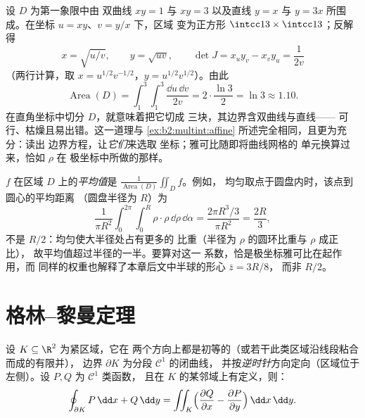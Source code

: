 \begin{example}[适应曲线型区域的
坐标]\label{ex:b2:multint:hyperbolicregion}
设 $D$ 为第一象限中由
双曲线 $xy = 1$ 与 $xy = 3$ 以及直线 $y = x$ 与
$y = 3x$ 所围成。在坐标 $u = xy$、$v = y/x$ 下，区域
变为正方形 $\intcc13 \times \intcc13$；反解得
\[
x = \sqrt{u/v}, \qquad y = \sqrt{uv},
\qquad
\det J = x_uy_v - x_vy_u = \frac{1}{2v}
\]
（两行计算，取 $x = u^{1/2}v^{-1/2}$，$y =
u^{1/2}v^{1/2}$）。由此
\[
\operatorname{Area}(D)
= \int_1^3\!\!\int_1^3\frac{\dd u\,\dd v}{2v}
= 2\cdot\frac{\ln 3}{2} = \ln 3 \approx 1.10 .
\]
在直角坐标中切分 $D$，就意味着把它切成
三块，其边界含双曲线与直线——
可行、枯燥且易出错。这一道理与
\cref{ex:b2:multint:affine} 所述完全相同，且更为充分：读出
边界方程，让\emph{它们}来选取
坐标；雅可比随即将曲线网格的
单元换算过来，恰如 $\rho$ 在
极坐标中所做的那样。
\end{example}

\begin{example}[平均值]\label{ex:b2:multint:average}
$f$ 在区域 $D$ 上的\emph{平均值}是
$\frac1{\operatorname{Area}(D)}\iint_Df$。例如，
均匀取点于圆盘内时，该点到圆心的平均距离
（圆盘半径为 $R$）为
\[
\frac{1}{\pi R^2}\int_0^{2\pi}\!\!\int_0^R
\rho\cdot\rho\,\dd\rho\,\dd\alpha
= \frac{2\pi R^3/3}{\pi R^2} = \frac{2R}3 ,
\]
不是 $R/2$：均匀使大半径处占有更多的
比重（半径为 $\rho$ 的圆环比重与 $\rho$ 成正比），
故平均值超过半径的一半。要算对这一
系数，恰是极坐标雅可比在起作用，而
同样的权重也解释了本章后文中半球的形心 $\bar z = 3R/8$，
而非 $R/2$。
\end{example}

\section{格林--黎曼定理}

\begin{theorem}[格林--黎曼]\label{thm:b2:multint:green}
设 $K \subseteq \R^2$ 为紧区域，它在
两个方向上都是初等的（或若干此类区域沿线段粘合而成的有限并），
边界 $\partial K$ 为分段 $\mathcal{C}^1$ 的闭曲线，
并按\emph{逆时针}方向定向（区域位于
左侧）。设 $P, Q$ 为 $\mathcal{C}^1$ 类函数，
且在 $K$ 的某邻域上有定义，则：
\[
\oint_{\partial K} P\,\dd x + Q\,\dd y
= \iint_K \Bigl(\frac{\partial Q}{\partial x}
- \frac{\partial P}{\partial y}\Bigr)\,\dd x\,\dd y .
\]
\end{theorem}

